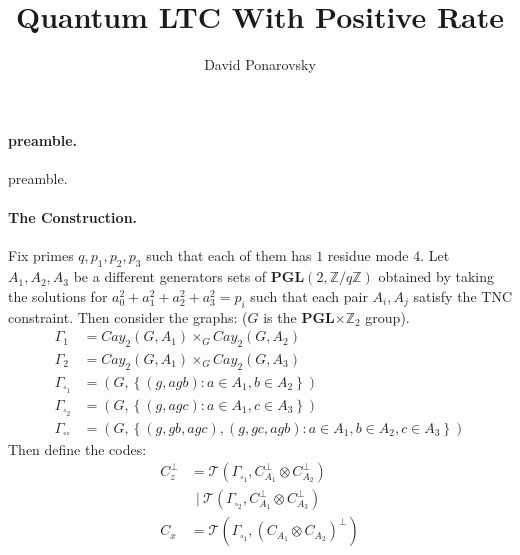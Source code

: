 \documentclass{article}
\begin{document}
\title{Quantum LTC With Positive Rate}
\author{David Ponarovsky}
\maketitle
\begin{multicols*}{2}


  \paragraph{preamble.} preamble.  
  \paragraph{The Construction.} Fix primes $q,p_1,p_2,p_3$ such that each of them has $1 $ residue mode $4$. Let $A_{1},A_{2},A_{3}$ be a different generators sets of $ \mathbf{PGL}(2 , \mathbb{Z} / q\mathbb{Z} )  $ 
  obtained by taking the solutions for $a_{0}^{2} + a_{1}^{2} +a_{2}^{2} +a_{3}^{2} = p_i $ such that each pair $A_i,A_j$ satisfy the 
  TNC constraint. Then consider the graphs: ($G$ is the \textbf{PGL}$\times \mathbb{Z}_2$ group).  
  \begin{equation*}
    \begin{split}
      \Gamma_{1}  &= Cay_{2}\left(  G, A_{1} \right)\times_{G} Cay_{2}\left(  G, A_{2} \right) \\
      \Gamma_{2}  &= Cay_{2}\left(  G, A_{1} \right)\times_{G} Cay_{2}\left(  G, A_{3} \right) \\
      \Gamma_{\square_{1}} &= \left( G, \left\{ \left( g, agb \right) : a \in A_{1}, b \in A_{2} \right\}  \right) \\
      \Gamma_{\square_{2}} &= \left( G, \left\{ \left( g, agc \right) : a \in A_{1}, c \in A_{3} \right\}  \right) \\
      \Gamma_{\square \square} &= \left( G, \left\{ \left( g, gb, agc \right), \left( g, gc, agb \right) :
      a \in A_{1}, b \in A_{2}, c \in A_{3} \right\}  \right) 
    \end{split}
  \end{equation*}
   Then define the codes:
	\begin{equation*}
	  \begin{split}
	    C_{z}^{\perp} & = \mathcal{T}\left( \Gamma_{\square_{1}}, C_{A_1}^{\perp} \otimes  C_{A_2}^{\perp}  \right) \\
	    & \ \ | \ \mathcal{T}\left(  \Gamma_{\square_{2}}, C_{A_1}^{\perp} \otimes C_{A_3}^{\perp}  \right) \\
	    C_{x} &=  \mathcal{T}\left(  \Gamma_{\square_{1}}, \left(  C_{A_1} \otimes C_{A_2} \right)^{\perp}  \right) \\

\end{split}
\end{equation*}
\end{multicols*}
\end{document}
